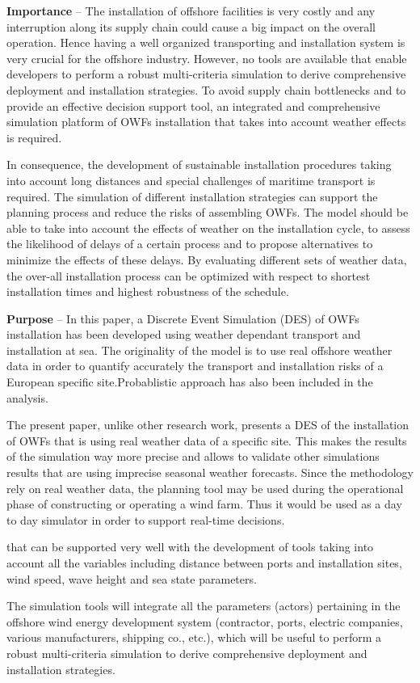\textbf{Importance} --
The installation of offshore facilities is very costly and any interruption along its supply chain could cause a big impact on the overall operation. Hence having a well organized transporting and installation system is very crucial for the offshore industry.
However, no tools are available that enable developers to perform a robust multi-criteria simulation to derive comprehensive deployment and installation strategies. To avoid supply chain bottlenecks and to provide an effective decision support tool, an integrated and comprehensive simulation platform of OWFs installation that takes into account weather effects is required.

In consequence, the development of sustainable installation procedures taking into account long distances and special challenges of maritime transport is required. The simulation of different installation strategies can support the planning process and reduce the risks of assembling OWFs. The model should be able to take into account the effects of weather on the installation cycle, to assess the likelihood of delays of a certain process and to propose alternatives to minimize the effects of these delays. By evaluating different sets of weather data, the over-all installation process can be optimized with respect to shortest installation times and highest robustness of the schedule.

\textbf{Purpose} --
In this paper, a Discrete Event Simulation (DES) of OWFs installation has been developed using weather dependant transport and installation at sea. The originality of the model is to use real offshore weather data in order to quantify accurately the transport and installation risks of a European specific site.Probablistic approach has also been included in the analysis.


The present paper, unlike other research work, presents a DES of the installation of OWFs that is using real weather data of a specific site. This makes the results of the simulation way more precise and allows to validate other simulations results that are using imprecise seasonal weather forecasts. Since the methodology rely on real weather data, the planning tool may be used during the operational phase of constructing or operating a wind farm. Thus it would be used as a day to day simulator in order to support real-time decisions.

 that can be supported very well with the development of tools taking into account all the variables including distance between ports and installation sites, wind speed, wave height and sea state parameters.

The simulation tools will integrate all the parameters (actors) pertaining in the offshore wind energy development system (contractor, ports, electric companies, various manufacturers, shipping co., etc.), which will be useful to perform a robust multi-criteria simulation to derive comprehensive deployment and installation strategies.

 